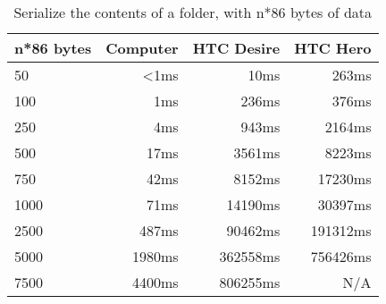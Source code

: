 \begin{table}
  \centering
  \caption{Serialize the contents of a folder, with n*86 bytes of data}
  \begin{tabular}{ | l | r | r | r |}
    \hline
    \textbf{n*86 bytes} & \textbf{Computer} & \textbf{HTC Desire} & \textbf{HTC Hero} \\ \hline
    50      & <1ms      &10ms     & 263ms       \\ \hline
    100     & 1ms       &236ms    & 376ms       \\ \hline
    250     & 4ms       &943ms    & 2164ms      \\ \hline   
    500     & 17ms      &3561ms   & 8223ms      \\ \hline
    750     & 42ms      &8152ms   & 17230ms     \\ \hline
    1000    & 71ms      &14190ms  & 30397ms     \\ \hline
    2500    & 487ms     &90462ms  & 191312ms    \\ \hline     
    5000    & 1980ms    &362558ms & 756426ms    \\ \hline 
    7500    & 4400ms    &806255ms & N/A         \\ \hline 
  \end{tabular}
  \label{tbl:folder:serializefolder}
\end{table}
